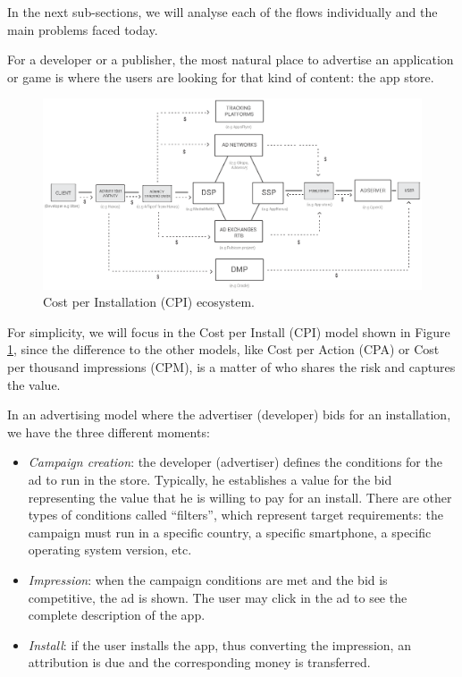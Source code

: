 
In the next sub-sections, we will analyse each of the flows individually and the main problems faced today.

For a developer or a publisher, the most natural place to advertise an application or game is where the users are looking for that kind of content: the app store.

\begin{figure}[!ht]
\centering
\includegraphics[width=\textwidth]{diagrams/cpi_flow.eps}
\caption{Cost per Installation (CPI) ecosystem.}
\label{fig:cpi}
\end{figure}

For simplicity, we will focus in the Cost per Install (CPI) model shown in Figure \ref{fig:cpi}, since the difference to the other models, like Cost per Action (CPA) or Cost per thousand impressions (CPM), is a matter of who shares the risk and captures the value.

In an advertising model where the advertiser (developer) bids for an installation, we have the three different moments:

\begin{itemize}
\item {\em Campaign creation}: the developer (advertiser) defines the conditions for the ad to run in the store. Typically, he establishes a value for the bid representing the value that he is willing to pay for an install. There are other types of conditions called ``filters'', which represent target requirements: the campaign must run in a specific country, a specific smartphone, a specific operating system version, etc.
\item {\em Impression}: when the campaign conditions are met and the bid is competitive, the ad is shown. The user may click in the ad to see the complete description of the app.
\item {\em Install}: if the user installs the app, thus converting the impression, an attribution is due and the corresponding money is transferred.
\end{itemize}

